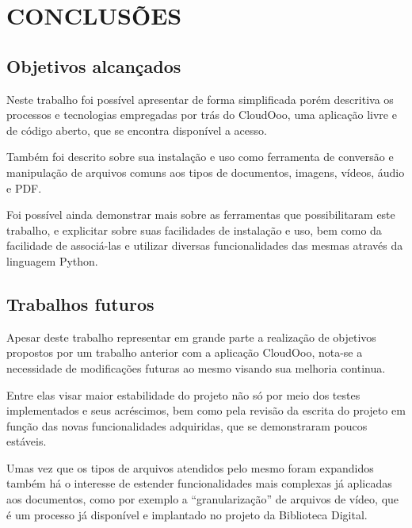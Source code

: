 \chapter{CONCLUSÕES}
\thispagestyle{empty}

\section{Objetivos alcançados}

Neste trabalho foi possível apresentar de forma simplificada porém descritiva os processos e tecnologias empregadas por trás do CloudOoo, uma aplicação livre e de código aberto, que se encontra disponível a acesso.

Também foi descrito sobre sua instalação e uso como ferramenta de conversão e manipulação de arquivos comuns aos tipos de documentos, imagens, vídeos, áudio e PDF.

Foi possível ainda demonstrar mais sobre as ferramentas que possibilitaram este trabalho, e explicitar sobre suas facilidades de instalação e uso, bem como da facilidade de associá-las e utilizar diversas funcionalidades das mesmas através da linguagem Python.

\section{Trabalhos futuros}

Apesar deste trabalho representar em grande parte a realização de objetivos propostos por um trabalho anterior com a aplicação CloudOoo, nota-se a necessidade de modificações futuras ao mesmo visando sua melhoria continua.

Entre elas visar maior estabilidade do projeto não só por meio dos testes implementados e seus acréscimos, bem como pela revisão da escrita do projeto em função das novas funcionalidades adquiridas, que se demonstraram poucos estáveis.

Umas vez que os tipos de arquivos atendidos pelo mesmo foram expandidos também há o interesse de estender funcionalidades mais complexas já aplicadas aos documentos, como por exemplo a ``granularização'' de arquivos de vídeo, que é um processo já disponível e implantado no projeto da Biblioteca Digital.
